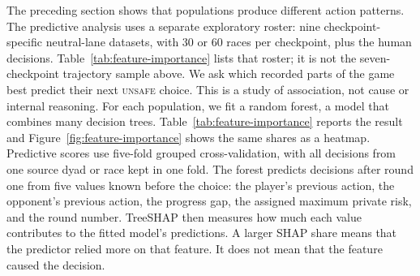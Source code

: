 \documentclass[sigconf,anonymous]{aamas}
\newcommand{\Unsafe}{\textsc{unsafe}}
\begin{document}
The preceding section shows that populations produce different action
patterns. The predictive analysis uses a separate exploratory roster: nine
checkpoint-specific neutral-lane datasets, with 30 or 60 races per checkpoint,
plus the human decisions. Table~\ref{tab:feature-importance} lists that roster;
it is not the seven-checkpoint trajectory sample above. We ask which recorded
parts of the game best predict their next
\Unsafe{} choice. This is a study of association, not cause or internal
reasoning. For each population, we fit a random forest, a model that combines
many decision trees. Table~\ref{tab:feature-importance} reports the result
and Figure~\ref{fig:feature-importance} shows the same shares as a heatmap.
Predictive scores use five-fold grouped cross-validation,
with all decisions from one source dyad or race kept in one fold. The forest
predicts decisions after round one from five values
known before the choice: the player's previous action, the opponent's previous
action, the progress gap, the assigned maximum private risk, and the round
number. TreeSHAP then measures how much each value contributes to the fitted
model's predictions. A larger SHAP share means that the predictor relied more
on that feature. It does not mean that the feature caused the decision.
\end{document}
